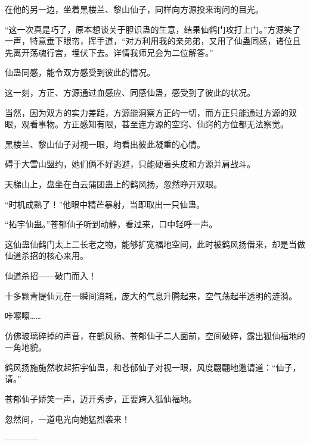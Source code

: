 \begin{this_body}
在他的另一边，坐着黑楼兰、黎山仙子，同样向方源投来询问的目光。

“这一次真是巧了，原本想谈关于胆识蛊的生意，结果仙鹤门攻打上门。”方源笑了一声，特意垂下眼帘，挥手道，“对方利用我的亲弟弟，又用了仙蛊同感，诸位且先离开荡魂行宫，埋伏下去。详情我师兄会为二位解答。”

仙蛊同感，能令双方感受到彼此的情况。

这一刻，方正、方源通过血感应、同感仙蛊，感受到了彼此的状况。

当然，因为双方的实力差距，方源能洞察方正的一切，而方正只能通过方源的双眼，观看事物。方正感知有限，甚至连方源的空窍、仙窍的方位都无法察觉。

黑楼兰、黎山仙子对视一眼，均看出彼此凝重的心情。

碍于大雪山盟约，她们俩不好逃避，只能硬着头皮和方源并肩战斗。

天梯山上，盘坐在白云蒲团蛊上的鹤风扬，忽然睁开双眼。

“时机成熟了！”他眼中精芒暴射，当即取出一只仙蛊。

“拓宇仙蛊。”苍郁仙子听到动静，看过来，口中轻呼一声。

这仙蛊仙鹤门太上二长老之物，能够扩宽福地空间，此时被鹤风扬借来，却是当做仙道杀招的核心来用。

仙道杀招――破门而入！

十多颗青提仙元在一瞬间消耗，庞大的气息升腾起来，空气荡起半透明的涟漪。

咔嚓嚓……

仿佛玻璃碎掉的声音，在鹤风扬、苍郁仙子二人面前，空间破碎，露出狐仙福地的一角地貌。

鹤风扬施施然收起拓宇仙蛊，和苍郁仙子对视一眼，风度翩翩地邀请道：“仙子，请。”

苍郁仙子娇笑一声，迈开秀步，正要跨入狐仙福地。

忽然间，一道电光向她猛烈袭来！

------------

\end{this_body}

